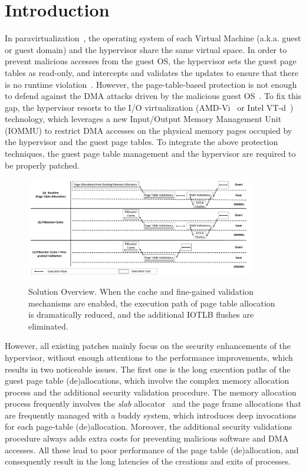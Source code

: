 \section{Introduction} \label{sec:intro}
In paravirtualization~\cite{XEN-SOSP03,whitaker2002scale}, the operating system of each Virtual Machine (a.k.a. guest or guest domain) and the hypervisor share the same virtual space.
In order to prevent malicious accesses from the guest OS, the hypervisor sets the guest page tables as read-only, and intercepts and validates the updates to ensure that there is no runtime violation~\cite{XEN-SOSP03}.
However, the page-table-based protection is not enough to defend against the DMA attacks driven by the malicious guest OS~\cite{disaggregation}.
To fix this gap, the hypervisor resorts to the I/O virtualization (AMD-Vi~\cite{amdvt} or Intel VT-d~\cite{intelvt}) technology, which leverages a new Input/Output Memory Management Unit (IOMMU) to restrict DMA accesses on the physical memory pages occupied by the hypervisor and the guest page tables.
To integrate the above protection techniques, the guest page table management and the hypervisor are required to be properly patched.

\begin{figure}[ht]
\centering
\includegraphics[width=0.9\textwidth]{image/overview/overview.pdf} \\
\caption{Solution Overview. When the \name cache and fine-gained validation mechanisms are enabled,
the execution path of page table allocation is dramatically reduced, and the additional IOTLB flushes are eliminated.}
\label{fig:overview}
\end{figure}

However, all existing patches mainly focus on the security enhancements of the hypervisor, without enough attentions to the performance improvements, which results in two noticeable issues.
The first one is the long execution paths of the guest page table (de)allocations, which involve the complex memory allocation process and the additional security validation procedure.
The memory allocation process frequently involves the \emph{slab} allocator~\cite{slaballocator} and the page frame allocations that are frequently managed with a buddy system, which introduces deep invocations for each page-table (de)allocation.
Moreover, the additional security validations procedure always adds extra costs for preventing malicious software and DMA accesses.
All these lead to poor performance of the page table (de)allocation, and consequently result in the long latencies of the creations and exits of processes.

